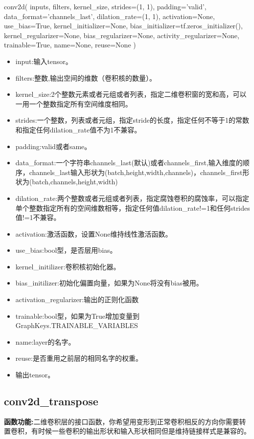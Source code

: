 \begin{python}
conv2d(
    inputs,
    filters,
    kernel_size,
    strides=(1, 1),
    padding='valid',
    data_format='channels_last',
    dilation_rate=(1, 1),
    activation=None,
    use_bias=True,
    kernel_initializer=None,
    bias_initializer=tf.zeros_initializer(),
    kernel_regularizer=None,
    bias_regularizer=None,
    activity_regularizer=None,
    trainable=True,
    name=None,
    reuse=None
)
\end{python}
\begin{itemize}
	\item input:输入tensor。
	\item filters:整数,输出空间的维数（卷积核的数量）。
	\item kernel\_size:2个整数元素或者元组或者列表，指定二维卷积窗的宽和高，可以一用一个整数指定所有空间维度相同。
	\item strides:一个整数，列表或者元组，指定stride的长度，指定任何不等于1的常数和指定任何dilation\_rate值不为1不兼容。
	\item padding:valid或者same。
	\item data\_format:一个字符串channels\_last(默认)或者channels\_first,输入维度的顺序，channels\_last输入形状为(batch,height,width,channels)，channels\_first形状为(batch,channels,height,width)
	\item dilation\_rate:两个整数或者元组或者列表，指定腐蚀卷积的腐蚀率，可以指定单个整数指定所有的空间维数相等，指定任何值dilation\_rate!=1和任何strides值!=1不兼容。
	\item activation:激活函数，设置None维持线性激活函数。
	\item use\_bias:bool型，是否层用bias。
	\item kernel\_initilizer:卷积核初始化器。
	\item bias\_initilizer:初始化偏置向量，如果为None将没有bias被用。
	\item activation\_regularizer:输出的正则化函数
	\item trainable:bool型，如果为True增加变量到GraphKeys.TRAINABLE\_VARIABLES
	\item name:layer的名字。
	\item reuse:是否重用之前层的相同名字的权重。
	\item 输出tensor。
\end{itemize}
\subsection{conv2d\_transpose}
\textbf{函数功能:}二维卷积层的接口函数，你希望用变形到正常卷积相反的方向你需要转置卷积，有时候一些卷积的输出形状和输入形状相同但是维持链接样式是兼容的。


